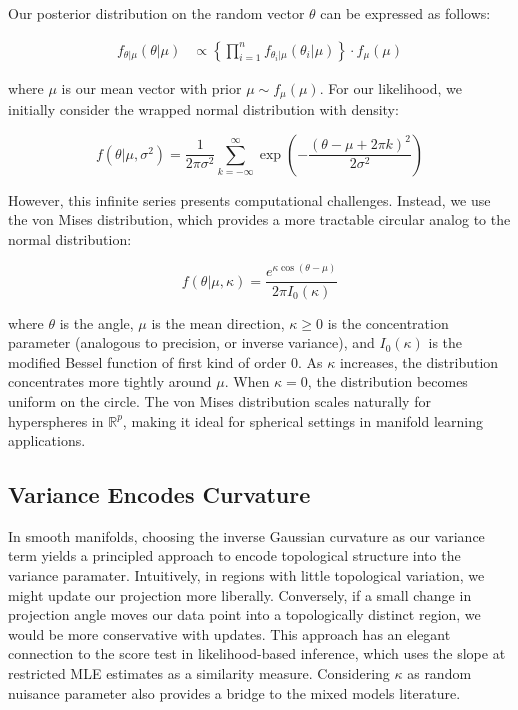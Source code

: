 \documentclass[twoside,11pt]{article}
\begin{document}
Our posterior distribution on the random vector $\theta$ can be expressed as follows:

$$
\begin{aligned}
  f_{\theta | \mu} (\theta | \mu) 
  &\propto \left\{ \prod_{i=1}^n f_{\theta_i | \mu}(\theta_i | \mu) \right\} \cdot f_{\mu}(\mu)
\end{aligned}
$$

where $\mu$ is our mean vector with prior $\mu \sim f_{\mu}(\mu)$. For our likelihood, we initially consider the wrapped normal distribution with density:

$$
f(\theta|\mu,\sigma^2) = 
\frac{1}{2\pi\sigma^2} \sum_{k=-\infty}^{\infty} \exp\left(-\frac{(\theta-\mu+2\pi k)^2}{2\sigma^2}\right)
$$

However, this infinite series presents computational challenges. Instead, we use the von Mises distribution, which provides a more tractable circular analog to the normal distribution:

$$
f(\theta|\mu,\kappa) = \frac{e^{\kappa \cos(\theta-\mu)}}{2\pi I_0(\kappa)}
$$

where $\theta$ is the angle, $\mu$ is the mean direction, $\kappa \geq 0$ is the concentration parameter (analogous to precision, or inverse variance), and $I_0(\kappa)$ is the modified Bessel function of first kind of order 0. As $\kappa$ increases, the distribution concentrates more tightly around $\mu$. When $\kappa = 0$, the distribution becomes uniform on the circle. The von Mises distribution scales naturally for hyperspheres in $\mathbb{R}^p$, making it ideal for spherical settings in manifold learning applications.

\subsection{Variance Encodes Curvature}\label{sc:curvature}

In smooth manifolds, choosing the inverse Gaussian curvature as our variance term yields a principled approach to encode topological structure into the variance paramater. Intuitively, in regions with little topological variation, we might update our projection more liberally. Conversely, if a small change in projection angle moves our data point into a topologically distinct region, we would be more conservative with updates. This approach has an elegant connection to the score test in likelihood-based inference, which uses the slope at restricted MLE estimates as a similarity measure. Considering $\kappa$ as random nuisance parameter also provides a bridge to the mixed models literature.
\end{document}
